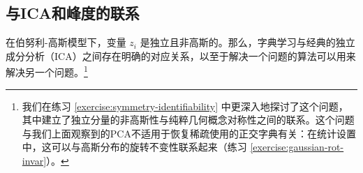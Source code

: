 \documentclass[../../book-main.tex]{subfiles}
\begin{document}


%
%
%
%



\subsection{与ICA和峰度的联系}
在伯努利-高斯模型下，变量 $z_i$ 是独立且非高斯的。那么，字典学习与经典的独立成分分析（ICA）之间存在明确的对应关系，以至于解决一个问题的算法可以用来解决另一个问题。\footnote{我们在练习 \ref{exercise:symmetry-identifiability} 中更深入地探讨了这个问题，其中建立了独立分量的非高斯性与纯粹几何概念对称性之间的联系。这个问题与我们上面观察到的PCA不适用于恢复稀疏使用的正交字典有关：在统计设置中，这可以与高斯分布的旋转不变性联系起来（练习 \ref{exercise:gaussian-rot-invar}）。} 
\end{document}
